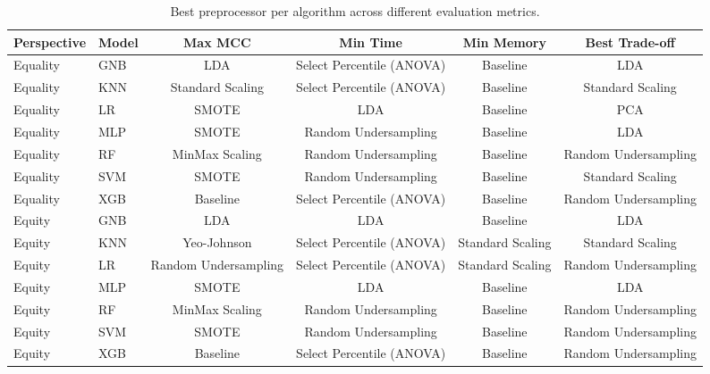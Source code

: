 \begin{table}
\caption{Best preprocessor per algorithm across different evaluation metrics.}
\label{tab:preprocessor_summary}
\begin{tabular}{llcccc}
\toprule
Perspective & Model & Max MCC & Min Time & Min Memory & Best Trade-off \\
\midrule
Equality & GNB & LDA & Select Percentile (ANOVA) & Baseline & LDA \\
Equality & KNN & Standard Scaling & Select Percentile (ANOVA) & Baseline & Standard Scaling \\
Equality & LR & SMOTE & LDA & Baseline & PCA \\
Equality & MLP & SMOTE & Random Undersampling & Baseline & LDA \\
Equality & RF & MinMax Scaling & Random Undersampling & Baseline & Random Undersampling \\
Equality & SVM & SMOTE & Random Undersampling & Baseline & Standard Scaling \\
Equality & XGB & Baseline & Select Percentile (ANOVA) & Baseline & Random Undersampling \\
Equity & GNB & LDA & LDA & Baseline & LDA \\
Equity & KNN & Yeo-Johnson & Select Percentile (ANOVA) & Standard Scaling & Standard Scaling \\
Equity & LR & Random Undersampling & Select Percentile (ANOVA) & Standard Scaling & Random Undersampling \\
Equity & MLP & SMOTE & LDA & Baseline & LDA \\
Equity & RF & MinMax Scaling & Random Undersampling & Baseline & Random Undersampling \\
Equity & SVM & SMOTE & Random Undersampling & Baseline & Random Undersampling \\
Equity & XGB & Baseline & Select Percentile (ANOVA) & Baseline & Random Undersampling \\
\bottomrule
\end{tabular}
\end{table}
